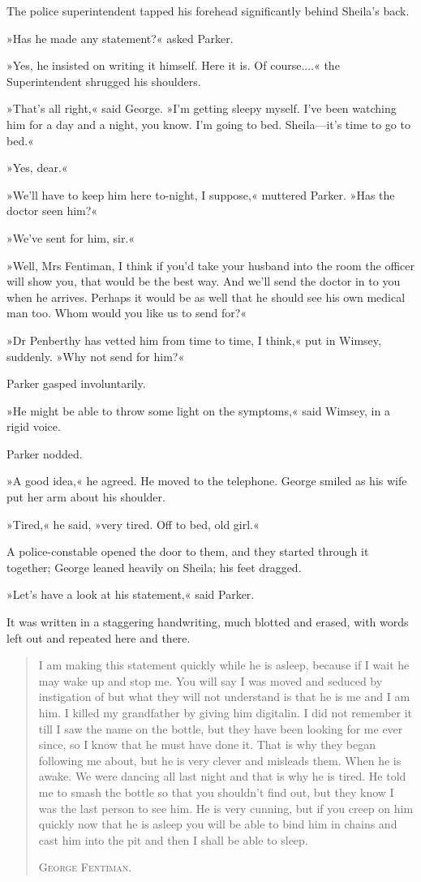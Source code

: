 The police superintendent tapped his forehead significantly behind Sheila's back.

»Has he made any statement?« asked Parker.

»Yes, he insisted on writing it himself. Here it is. Of course....« the Superintendent shrugged his shoulders.

»That's all right,« said George. »I'm getting sleepy myself. I've been watching him for a day and a night, you know. I'm going to bed. Sheila\allowbreak---\allowbreak it's time to go to bed.«

»Yes, dear.«

»We'll have to keep him here to-night, I suppose,« muttered Parker. »Has the doctor seen him?«

»We've sent for him, sir.«

»Well, Mrs Fentiman, I think if you'd take your husband into the room the officer will show you, that would be the best way. And we'll send the doctor in to you when he arrives. Perhaps it would be as well that he should see his own medical man too. Whom would you like us to send for?«

»Dr Penberthy has vetted him from time to time, I think,« put in Wimsey, suddenly. »Why not send for him?«

Parker gasped involuntarily.

»He might be able to throw some light on the symptoms,« said Wimsey, in a rigid voice.

Parker nodded.

»A good idea,« he agreed. He moved to the telephone. George smiled as his wife put her arm about his shoulder.

»Tired,« he said, »very tired. Off to bed, old girl.«

A police-constable opened the door to them, and they started through it together; George leaned heavily on Sheila; his feet dragged.

»Let's have a look at his statement,« said Parker.

It was written in a staggering handwriting, much blotted and erased, with words left out and repeated here and there.

\begin{quote}
I am making this statement quickly while he is asleep, because if I wait he may wake up and stop me. You will say I was moved and seduced by instigation of but what they will not understand is that he is me and I am him. I killed my grandfather by giving him digitalin. I did not remember it till I saw the name on the bottle, but they have been looking for me ever since, so I know that he must have done it. That is why they began following me about, but he is very clever and misleads them. When he is awake. We were dancing all last night and that is why he is tired. He told me to smash the bottle so that you shouldn't find out, but they know I was the last person to see him. He is very cunning, but if you creep on him quickly now that he is asleep you will be able to bind him in chains and cast him into the pit and then I shall be able to sleep.
\begin{flushright}
\textsc{George Fentiman.}
\end{flushright}
\end{quote}

